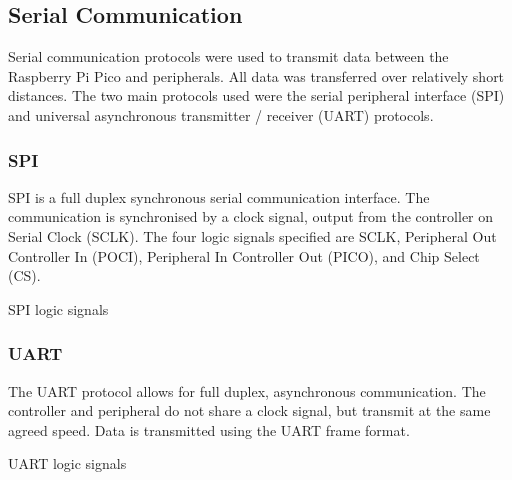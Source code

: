 \documentclass[12pt,a4paper]{report}
\makeatletter
\newenvironment{figurehere}
  {\def\@captype{figure}}
  {}
\makeatother
\begin{document}
\subsection{Serial Communication}
Serial communication protocols were used to transmit data between the Raspberry Pi Pico and peripherals. All data was transferred over relatively short distances. The two main protocols used were the serial peripheral interface (SPI) and universal asynchronous transmitter / receiver (UART) protocols. 
\subsubsection{SPI}
SPI is a full duplex synchronous serial communication interface. The communication is synchronised by a clock signal, output from the controller on Serial Clock (SCLK). The four logic signals specified are SCLK, Peripheral Out Controller In (POCI), Peripheral In Controller Out (PICO), and Chip Select (CS). 
\begin{figurehere}
\begin{center}
\end{center}
\caption{SPI logic signals}
\end{figurehere}
\subsubsection{UART}
The UART protocol allows for full duplex, asynchronous communication. The controller and peripheral do not share a clock signal, but transmit at the same agreed speed. Data is transmitted using the UART frame format. 
\begin{figurehere}
\begin{center}
\end{center}
\caption{UART logic signals}
\end{figurehere}
\end{document}
